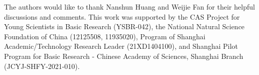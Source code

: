 \documentclass[%
 reprint,
 amsmath,amssymb,
 aps,
]{revtex4-2}
\begin{document}
\begin{acknowledgments}
The authors would like to thank Nanshun Huang and Weijie Fan for their helpful discussions and comments. This work was supported by the CAS Project for Young Scientists in Basic Research (YSBR-042), the National Natural Science Foundation of China (12125508, 11935020), Program of Shanghai Academic/Technology Research Leader (21XD1404100), and Shanghai Pilot Program for Basic Research - Chinese Academy of Sciences, Shanghai Branch (JCYJ-SHFY-2021-010).
\end{acknowledgments}


\end{document}
